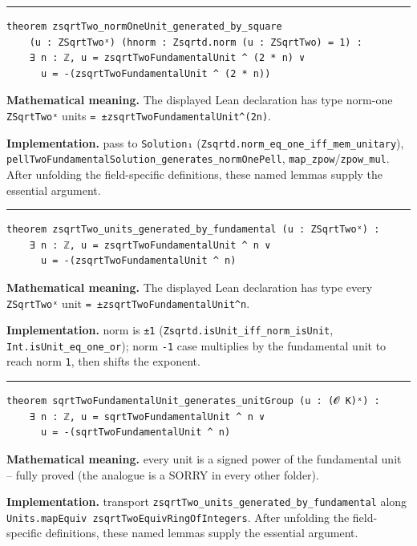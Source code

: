 \documentclass[UTF8,a4paper,11pt,fontset=fandol]{ctexart}
\theoremstyle{definition}
\newcommand{\statementsep}{\par\medskip\hrule\medskip}
\begin{document}
\statementsep
\begin{verbatim}
theorem zsqrtTwo_normOneUnit_generated_by_square
    (u : ZSqrtTwoˣ) (hnorm : Zsqrtd.norm (u : ZSqrtTwo) = 1) :
    ∃ n : ℤ, u = zsqrtTwoFundamentalUnit ^ (2 * n) ∨
      u = -(zsqrtTwoFundamentalUnit ^ (2 * n))
\end{verbatim}
\noindent\textbf{Mathematical meaning.} The displayed Lean declaration has type norm-one \texttt{ZSqrtTwoˣ} units \texttt{= ±zsqrtTwoFundamentalUnit\textasciicircum{}(2n)}.\par
\noindent\textbf{Implementation.} pass to \texttt{Solution₁} (\texttt{Zsqrtd.\allowbreak{}norm\_\allowbreak{}eq\_\allowbreak{}one\_\allowbreak{}iff\_\allowbreak{}mem\_\allowbreak{}unitary}), \texttt{pellTwoFundamentalSolution\_\allowbreak{}generates\_\allowbreak{}normOnePell}, \texttt{map\_\allowbreak{}zpow}/\texttt{zpow\_\allowbreak{}mul}. After unfolding the field-specific definitions, these named lemmas supply the essential argument.\par
\statementsep
\begin{verbatim}
theorem zsqrtTwo_units_generated_by_fundamental (u : ZSqrtTwoˣ) :
    ∃ n : ℤ, u = zsqrtTwoFundamentalUnit ^ n ∨
      u = -(zsqrtTwoFundamentalUnit ^ n)
\end{verbatim}
\noindent\textbf{Mathematical meaning.} The displayed Lean declaration has type every \texttt{ZSqrtTwoˣ} unit \texttt{= ±zsqrtTwoFundamentalUnit\textasciicircum{}n}.\par
\noindent\textbf{Implementation.} norm is \texttt{±1} (\texttt{Zsqrtd.\allowbreak{}isUnit\_\allowbreak{}iff\_\allowbreak{}norm\_\allowbreak{}isUnit}, \texttt{Int.\allowbreak{}isUnit\_\allowbreak{}eq\_\allowbreak{}one\_\allowbreak{}or}); norm \texttt{-1} case multiplies by the fundamental unit to reach norm \texttt{1}, then shifts the exponent.\par
\statementsep
\begin{verbatim}
theorem sqrtTwoFundamentalUnit_generates_unitGroup (u : (𝓞 K)ˣ) :
    ∃ n : ℤ, u = sqrtTwoFundamentalUnit ^ n ∨
      u = -(sqrtTwoFundamentalUnit ^ n)
\end{verbatim}
\noindent\textbf{Mathematical meaning.} every unit is a signed power of the fundamental unit -- fully proved (the analogue is a SORRY in every other folder).\par
\noindent\textbf{Implementation.} transport \texttt{zsqrtTwo\_\allowbreak{}units\_\allowbreak{}generated\_\allowbreak{}by\_\allowbreak{}fundamental} along \texttt{Units.\allowbreak{}mapEquiv zsqrtTwoEquivRingOfIntegers}. After unfolding the field-specific definitions, these named lemmas supply the essential argument.\par
\end{document}
